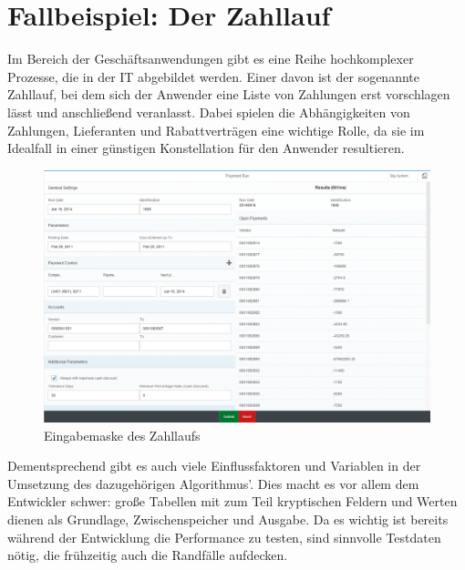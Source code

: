 \section{Fallbeispiel: Der Zahllauf}\label{chap:paymentrun}

%
%

Im Bereich der Geschäftsanwendungen gibt es eine Reihe hochkomplexer Prozesse, die in der IT abgebildet werden.
Einer davon ist der sogenannte Zahllauf, bei dem sich der Anwender eine Liste von Zahlungen erst vorschlagen lässt und anschließend veranlasst.
Dabei spielen die Abhängigkeiten von Zahlungen, Lieferanten und Rabattverträgen eine wichtige Rolle, da sie im Idealfall in einer günstigen Konstellation für den Anwender resultieren.

\begin{figure}[ht]
	\centering
  \includegraphics[width=1\textwidth]{figures/paymentrun.png}
	\caption{Eingabemaske des Zahllaufs}
	\label{fig:paymentrun}
\end{figure}

Dementsprechend gibt es auch viele Einflussfaktoren und Variablen in der Umsetzung des dazugehörigen Algorithmus'.
Dies macht es vor allem dem Entwickler schwer: große Tabellen mit zum Teil kryptischen Feldern und Werten dienen als Grundlage, Zwischenspeicher und Ausgabe.
Da es wichtig ist bereits während der Entwicklung die Performance zu testen, sind sinnvolle Testdaten nötig, die frühzeitig auch die Randfälle aufdecken.

